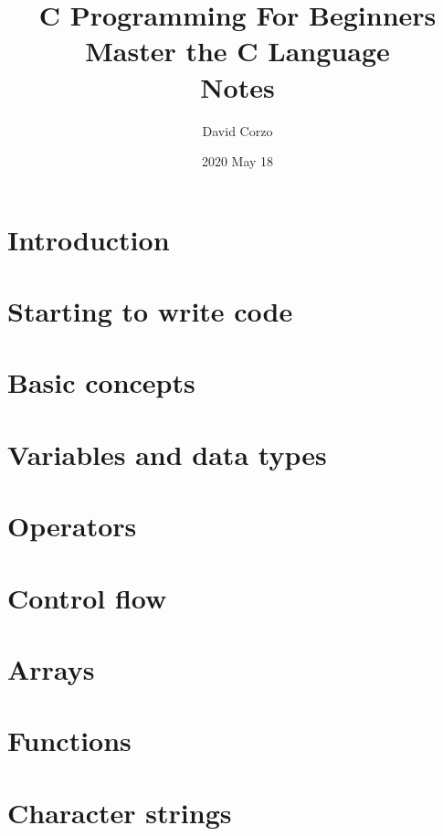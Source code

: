 \documentclass[openany]{book}
\title{C Programming For Beginners \\ Master the C Language \\ Notes }
\date{2020 May 18} %
\author{David Corzo}
\begin{document}
\maketitle
\tableofcontents

\chapter{Introduction}


\chapter{Starting to write code}


\chapter{Basic concepts}


\chapter{Variables and data types}


\chapter{Operators}


\chapter{Control flow}


\chapter{Arrays}


\chapter{Functions}


\chapter{Character strings}

\end{document}
